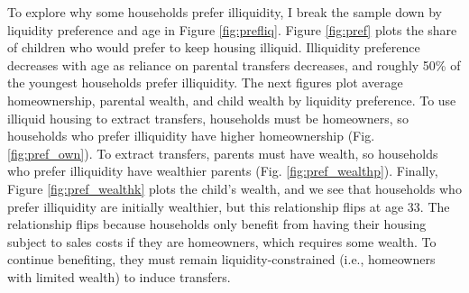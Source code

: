 \documentclass[12pt]{article}
\begin{document}
To explore why some households prefer illiquidity, I break the sample down by liquidity preference and age in Figure \ref{fig:prefliq}. Figure \ref{fig:pref} plots the share of children who would prefer to keep housing illiquid. Illiquidity preference decreases with age as reliance on parental transfers decreases, and roughly 50\% of the youngest households prefer illiquidity. The next figures plot average homeownership, parental wealth, and child wealth by liquidity preference. To use illiquid housing to extract transfers, households must be homeowners, so households who prefer illiquidity have higher homeownership (Fig. \ref{fig:pref_own}). To extract transfers, parents must have wealth, so households who prefer illiquidity have wealthier parents (Fig. \ref{fig:pref_wealthp}). Finally, Figure \ref{fig:pref_wealthk} plots the child's wealth, and we see that households who prefer illiquidity are initially wealthier, but this relationship flips at age 33. The relationship flips because households only benefit from having their housing subject to sales costs if they are homeowners, which requires some wealth. To continue benefiting, they must remain liquidity-constrained (i.e., homeowners with limited wealth) to induce transfers.
\end{document}
